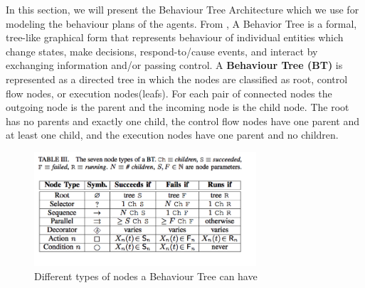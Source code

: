 \documentclass[journal]{IEEEtran}
\theoremstyle{definition}
\newcommand\patrizio[1]{\nb{Patrizio}{#1}}
\begin{document}
In this section, we will present the Behaviour Tree Architecture which we use for modeling the behaviour plans of the agents.
From \cite{dromey2003requirements}, A Behavior Tree is a formal, tree-like graphical form that
represents behaviour of individual entities
which change states, make decisions, respond-to/cause events, and interact by exchanging information and/or passing control.
A \textbf{Behaviour Tree (BT)} is represented as a directed tree in which the nodes are classified as root, control flow nodes, or execution nodes(leafs). For each pair of connected nodes the outgoing node is the parent and the incoming node is the child node. The root has no parents and exactly one child, the control flow nodes have one parent and at least one child, and the execution nodes have one parent and no children. 

\begin{figure}[h]
\includegraphics[width=3.25in]{Figures/BT_NODES.png}
\caption{Different types of nodes a Behaviour Tree can have}
\end{figure}
\end{document}
